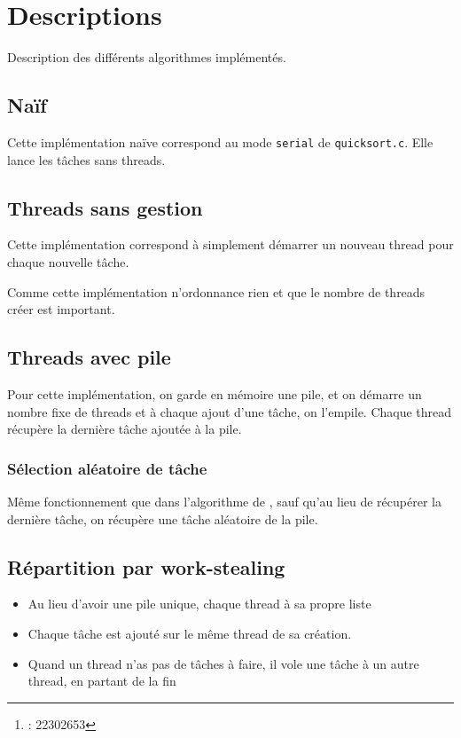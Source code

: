 \documentclass{article}
\title{\docTitle}
\author{\href{\authorMail}{\anri}\thanks{\anri : 22302653}}
\date{Année universitaire 2023-2024}
\newcommand{\docref}[1]{\textit{\nameref{#1}}} %
\begin{document}
\maketitle
\flushbottom
\tableofcontents
\clearpage

\section{Descriptions}
Description des différents algorithmes implémentés.

\subsection{Naïf}
Cette implémentation naïve correspond au mode \texttt{serial}
de \texttt{quicksort.c}. Elle lance les tâches sans threads.

\subsection[Threads sans gestion]{Threads sans gestion}
Cette implémentation correspond à simplement démarrer un nouveau thread
pour chaque nouvelle tâche.

Comme cette implémentation n'ordonnance rien et que le nombre de threads créer
est important.

\subsection{Threads avec pile}\label{desc:th_pile}
Pour cette implémentation, on garde en mémoire une pile,
et on démarre un nombre fixe de threads et à chaque ajout d'une tâche,
on l'empile. Chaque thread récupère la dernière tâche ajoutée à la pile.

\subsubsection{Sélection aléatoire de tâche}
Même fonctionnement que dans l'algorithme de \docref{desc:th_pile}, sauf
qu'au lieu de récupérer la dernière tâche, on récupère une tâche
aléatoire de la pile.

\subsection{Répartition par work-stealing}
\begin{itemize}
  \item Au lieu d'avoir une pile unique, chaque thread à sa propre liste
  \item Chaque tâche est ajouté sur le même thread de sa création.
  \item Quand un thread n'as pas de tâches à faire, il vole une tâche à un autre
        thread, en partant de la fin
\end{itemize}
\end{document}
